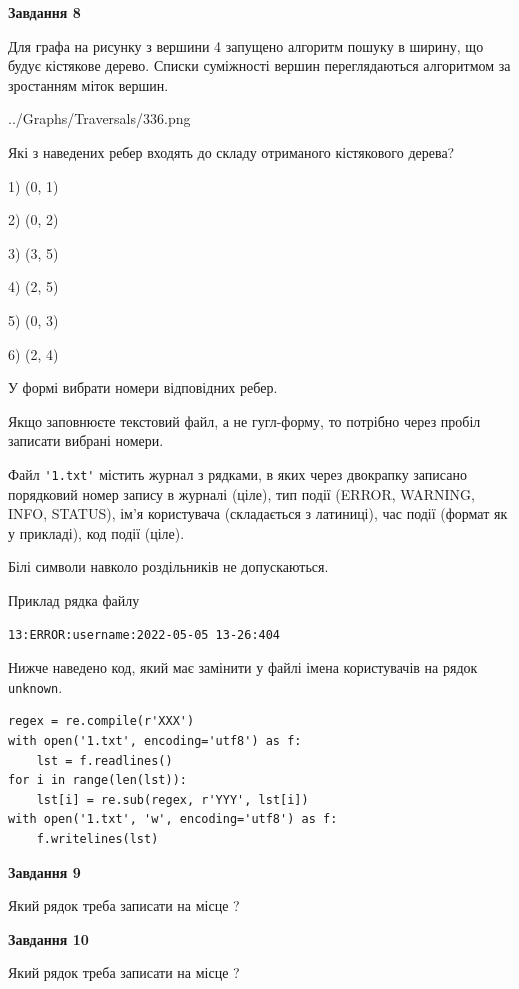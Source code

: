 \documentclass[12pt, ukrainian]{article}
\def\code#1{\Verb!#1!}
\begin{document}
{\begin {large}
{\begin {center}\textbf{Завдання 8}\end {center}}\par
Для графа на рисунку з вершини 4 запущено алгоритм пошуку в ширину, що будує кістякове дерево. Списки суміжності вершин переглядаються алгоритмом за зростанням міток вершин.\par
\begin{center}
	{../Graphs/Traversals/336.png}
\end{center}
\par Які з наведених ребер входять до складу отриманого кістякового дерева?\par
1) (0, 1)\par
2) (0, 2)\par
3) (3, 5)\par
4) (2, 5)\par
5) (0, 3)\par
6) (2, 4)\par
{\vskip 15pt} У формі вибрати номери відповідних ребер.


Якщо заповнюєте текстовий файл, а не гугл-форму, то потрібно через пробіл записа\-ти вибрані номери.\par
\newpage


Файл \code{'1.txt'} містить журнал з рядками, в яких через двокрапку записано поряд\-ко\-вий номер запису в журналі (ціле), тип події (ERROR, WARNING, INFO, STATUS), ім'я користувача (складається з латиниці), час події (фор\-мат як у прикладі), код події (ціле).

Білі символи навколо роздільників не допускаються.

Приклад рядка файлу



\begin{verbatim}
13:ERROR:username:2022-05-05 13-26:404
\end{verbatim}


Нижче наведено код, який має замінити у файлі імена користувачів на рядок \code{unknown}.



\begin{verbatim}
regex = re.compile(r'XXX')
with open('1.txt', encoding='utf8') as f:
    lst = f.readlines()
for i in range(len(lst)):
    lst[i] = re.sub(regex, r'YYY', lst[i])
with open('1.txt', 'w', encoding='utf8') as f:
    f.writelines(lst)
\end{verbatim}




{\begin {center}\textbf{Завдання 9}\end {center}}\par
Який рядок треба записати на місце  ?\par
\vspace{5mm}


{\begin {center}\textbf{Завдання 10}\end {center}}\par
Який рядок треба записати на місце  ?\par


\newpage


\end {large}}
\end{document}
